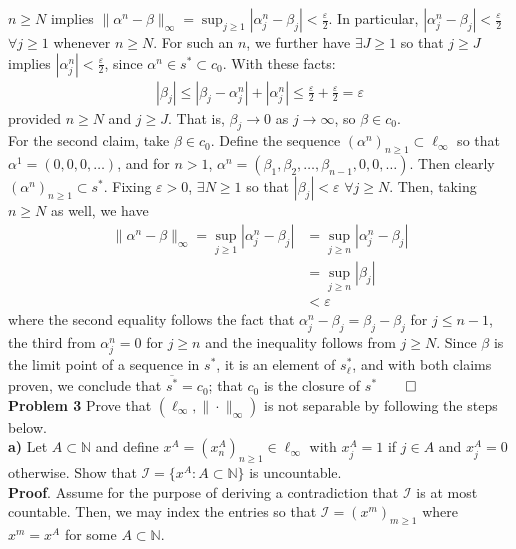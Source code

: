 \documentclass[10pt]{article}
\newcommand{\mbb}[1]{\mathbb{#1}}
\newcommand{\1}[1]{\mathbbm{1}_{#1}}
\newcommand{\mc}[1]{\mathcal{#1}}
\begin{document}
    $n\geq N$ implies $\|\alpha^n-\beta\|_\infty=\sup_{j\geq 1}|\alpha^n_j-\beta_j|<\tfrac{\varepsilon}{2}$. In particular, $|\alpha^n_j-\beta_j|<\tfrac{\varepsilon}{2}$ $\forall j\geq 1$ whenever $n\geq N$. For such an $n$, we further have $\exists J\geq 1$ so that $j\geq J$
    implies $|\alpha^n_j|<\tfrac{\varepsilon}{2}$, since $\alpha^n\in s^\ast\subset c_0$. With these facts:
    \begin{align*}
        |\beta_j|\leq |\beta_j-\alpha^n_j|+|\alpha^n_j|\leq \frac{\varepsilon}{2}+\frac{\varepsilon}{2}=\varepsilon
    \end{align*}
    provided $n\geq N$ and $j\geq J$. That is, $\beta_j\rightarrow 0$ as $j\rightarrow\infty$, so $\beta\in c_0$.\\[5pt]
    For the second claim, take $\beta\in c_0$. Define the sequence $(\alpha^n)_{n\geq 1}\subset\ell_\infty$ so that $\alpha^1=(0,0,0,\dots)$, and for $n>1$, $\alpha^n=(\beta_1,\beta_2,\dots,\beta_{n-1},0,0,\dots)$.
    Then clearly $(\alpha^n)_{n\geq 1}\subset s^\ast$. Fixing $\varepsilon>0$, $\exists N\geq 1$ so that $|\beta_j|<\varepsilon$ $\forall j\geq N$. Then, taking $n\geq N$ as well, we have
    \begin{align*}
        \|\alpha^n-\beta\|_\infty=\sup_{j\geq 1}|\alpha^n_j-\beta_j|&=\sup_{j\geq n}|\alpha^n_j-\beta_j|\\
        &=\sup_{j\geq n}|\beta_j|\\
        &<\varepsilon
    \end{align*}
    where the second equality follows the fact that $\alpha^n_j-\beta_j=\beta_j-\beta_j$ for $j\leq n-1$, the third from $\alpha^n_j=0$ for $j\geq n$ and the inequality follows from $j\geq N$. Since $\beta$ is the limit point of 
    a sequence in $s^\ast$, it is an element of $s^\ast_\ell$, and with both claims proven, we conclude that $\overline{s^\ast}=c_0$; that $c_0$ is the closure of $s^\ast$\hfill{$\qed$}\\[5pt]
    {\bf Problem 3} Prove that $(\ell_\infty,\|\cdot\|_\infty)$ is not separable by following the steps below.\\[5pt]
    {\bf a)} Let $A\subset\mbb{N}$ and define $x^A=(x^A_n)_{n\geq 1}\in\ell_\infty$ with $x^A_j=1$ if $j\in A$ and $x^A_j=0$ otherwise. Show that $\mc{I}=\{x^A:A\subset \mbb{N}\}$ is uncountable.\\[5pt]
    {\bf Proof}. Assume for the purpose of deriving a contradiction that $\mc{I}$ is at most countable. Then, we may index the entries so that $\mc{I}=(x^m)_{m\geq 1}$ where $x^m=x^A$ for some $A\subset\mbb{N}$.
\end{document}
